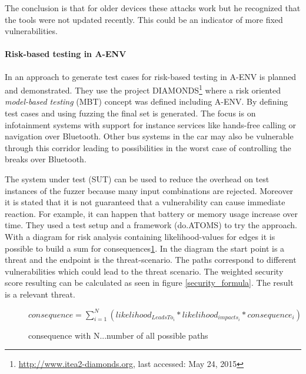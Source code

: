 \documentclass[12pt,a4paper]{article}
\begin{document}
The conclusion is that for older devices these attacks work but he recognized that the tools were not updated recently. This could be an indicator of more fixed vulnerabilities.

\paragraph{Risk-based testing in A-ENV}
In \cite{DBLP:conf/automotiveSS/JakobKSGMSF12} an approach to generate test cases for risk-based testing in A-ENV is planned and demonstrated. They use the project DIAMONDS\footnote{\url{http://www.itea2-diamonds.org}, last accessed: May 24, 2015} where a risk oriented \emph{model-based testing} (MBT) concept was defined including A-ENV. By defining test cases and using fuzzing the final set is generated. The focus is on infotainment systems with support for instance services like hands-free calling or navigation over Bluetooth. Other bus systems in the car may also be vulnerable through this corridor leading to possibilities in the worst case of controlling the breaks over Bluetooth.

The system under test (SUT) can be used to reduce the overhead on test instances of the fuzzer because many input combinations are rejected. Moreover it is stated that it is not guaranteed that a vulnerability can cause immediate reaction. For example, it can happen that battery or memory usage increase over time. They used a test setup and a framework (do.ATOMS) to try the approach. With a diagram for risk analysis containing likelihood-values for edges it is possible to build a sum for consequences\ref{consequences_formula}. In the diagram the start point is a threat and the endpoint is the threat-scenario. The paths correspond to different vulnerabilities which could lead to the threat scenario. 
The weighted security score resulting can be calculated as seen in figure \ref{security_formula}. The result is a relevant threat.

\begin{figure}[h]
\begin{center}
	\begin{math}
	consequence = \sum_{i=1}^{N} (likelihood_{LeadsTo_i} * likelihood_{impacts_i} * consequence_i)
	\end{math}
	\caption{consequence with N...number of all possible paths \cite{DBLP:conf/automotiveSS/JakobKSGMSF12} }
\label{consequences_formula}
\end{center}
\end{figure}
\end{document}
